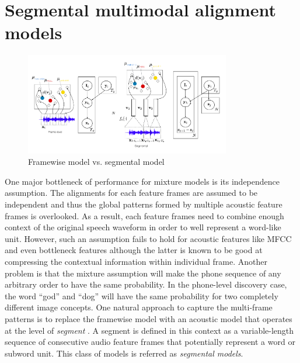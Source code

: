 \documentclass[journal]{IEEEtran}
\begin{document}
\section{Segmental multimodal alignment models}
\begin{figure}[t]
    \centering
    \includegraphics[width=0.8\textwidth]{fig_2.png}
    \caption{Framewise model vs. segmental model}
    \label{fig:frame-segmental-comparison}
\end{figure}
One major bottleneck of performance for mixture models is its independence assumption. The alignments for each feature frames are assumed to be independent and thus the global patterns formed by multiple acoustic feature frames is overlooked. As a result, each feature frames need to  combine enough context of the original speech waveform in order to well represent a word-like unit. However, such an assumption fails to hold for acoustic features like MFCC and even bottleneck features although the latter is known to be good at compressing the contextual information within individual frame. Another problem is that the mixture assumption will make the phone sequence of any arbitrary order to have the same probability. In the phone-level discovery case, the word ``god'' and ``dog'' will have the same probability for two completely different image concepts. One natural approach to capture the multi-frame patterns is to replace the framewise model with an acoustic model that operates at the level of \textit{segment} \cite{Kamper2017}. A segment is defined in this context as a variable-length sequence of consecutive audio feature frames that potentially represent a word or subword unit. This class of models is referred as \textit{segmental models}.   
\end{document}

